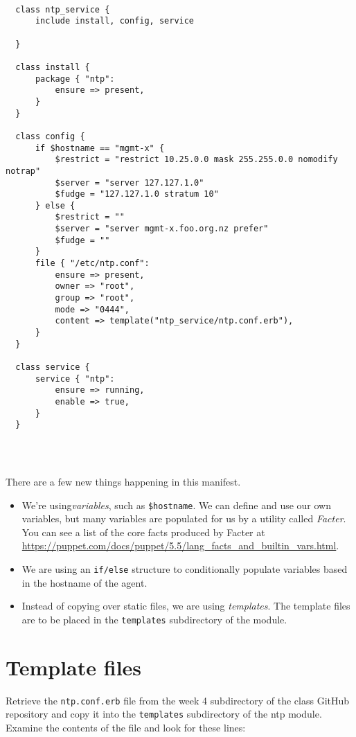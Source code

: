 \documentclass{article}   	%
\begin{document}
\begin{verbatim}

  class ntp_service {
      include install, config, service

  }

  class install {
      package { "ntp":
          ensure => present,
      }
  }

  class config {
      if $hostname == "mgmt-x" {
          $restrict = "restrict 10.25.0.0 mask 255.255.0.0 nomodify notrap"
          $server = "server 127.127.1.0"
          $fudge = "127.127.1.0 stratum 10"
      } else {
          $restrict = ""
          $server = "server mgmt-x.foo.org.nz prefer"
          $fudge = ""
      }
      file { "/etc/ntp.conf":
          ensure => present,
          owner => "root",
          group => "root",
          mode => "0444",
          content => template("ntp_service/ntp.conf.erb"),
      }    
  }

  class service {
      service { "ntp":
          ensure => running,
          enable => true,
      }    
  }


  
\end{verbatim}



There are a few new things happening in this manifest.
\begin{itemize}
  \item We're using\emph{variables}, such as \texttt{\$hostname}.  We can define and use our own variables, but many variables are populated for us by a utility called \emph{Facter}.  You can see a list of the core facts produced by Facter at \url{https://puppet.com/docs/puppet/5.5/lang_facts_and_builtin_vars.html}.
  \item We are using an \texttt{if/else} structure to conditionally populate variables based in the hostname of the agent.
  \item Instead of copying over static files, we are using \emph{templates}.  The template files are to be placed in the \texttt{templates} subdirectory of the module.
\end{itemize}

\section{Template files}
Retrieve the \texttt{ntp.conf.erb} file from the week 4 subdirectory of the class GitHub repository and copy it into the \texttt{templates} subdirectory of the ntp module. Examine the contents of the file and look for these lines:
\end{document}
